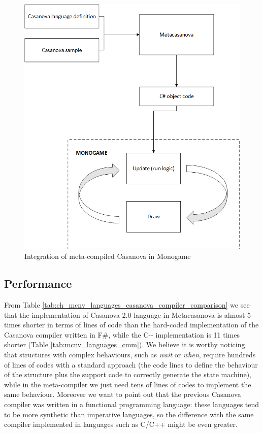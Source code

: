 \begin{figure}
	\centering
	\includegraphics[width = \textwidth]{Figures/chapter_languages/monogame_integration}
	\caption{Integration of meta-compiled Casanova in Monogame}
	\label{fig:ch_mcnv_languages_monogame_integration}
\end{figure}

\subsection{Performance}
From Table \ref{tab:ch_mcnv_languages_casanova_compiler_comparison} we see that the implementation of Casanova 2.0 language in Metacasanova is almost 5 times shorter in terms of lines of code than the hard-coded implementation of the Casanova compiler written in F\#, while the C-{}- implementation is 11 times shorter (Table \ref{tab:mcnv_languages_cmm}). We believe it is worthy noticing that structures with complex behaviours, such as \textit{wait} or \textit{when}, require hundreds of lines of codes with a standard approach (the code lines to define the behaviour of the structure plus the support code to correctly generate the state machine), while in the meta-compiler we just need tens of lines of codes to implement the same behaviour. Moreover we want to point out that the previous Casanova compiler was written in a functional programming language: these languages tend to be more synthetic than imperative languages, so the difference with the same compiler implemented in languages such as C/C++ might be even greater.

